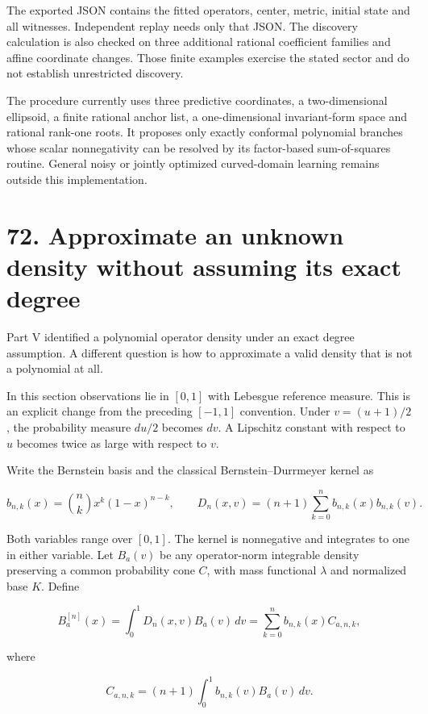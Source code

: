 \documentclass[11pt,letterpaper]{article}
\begin{document}
The exported JSON contains the fitted operators, center, metric, initial
state and all witnesses. Independent replay needs only that JSON. The
discovery calculation is also checked on three additional rational
coefficient families and affine coordinate changes. Those finite
examples exercise the stated sector and do not establish unrestricted
discovery.

The procedure currently uses three predictive coordinates, a
two-dimensional ellipsoid, a finite rational anchor list, a
one-dimensional invariant-form space and rational rank-one roots. It
proposes only exactly conformal polynomial branches whose scalar
nonnegativity can be resolved by its factor-based sum-of-squares
routine. General noisy or jointly optimized curved-domain learning
remains outside this implementation.

\section{72. Approximate an unknown density without assuming its exact
degree}\label{approximate-an-unknown-density-without-assuming-its-exact-degree}

Part V identified a polynomial operator density under an exact degree
assumption. A different question is how to approximate a valid density
that is not a polynomial at all.

In this section observations lie in \([0,1]\) with Lebesgue reference
measure. This is an explicit change from the preceding \([-1,1]\)
convention. Under \(v=(u+1)/2\), the probability measure \(du/2\)
becomes \(dv\). A Lipschitz constant with respect to \(u\) becomes twice
as large with respect to \(v\).

Write the Bernstein basis and the classical Bernstein--Durrmeyer kernel
as

\[
b_{n,k}(x)=\binom nk x^k(1-x)^{n-k},\qquad
D_n(x,v)=(n+1)\sum_{k=0}^n b_{n,k}(x)b_{n,k}(v).
\]

Both variables range over \([0,1]\). The kernel is nonnegative and
integrates to one in either variable. Let \(B_a(v)\) be any
operator-norm integrable density preserving a common probability cone
\(C\), with mass functional \(\lambda\) and normalized base \(K\).
Define

\[
B_a^{[n]}(x)=\int_0^1D_n(x,v)B_a(v)\,dv
=\sum_{k=0}^n b_{n,k}(x)C_{a,n,k},
\]

where

\[
C_{a,n,k}=(n+1)\int_0^1b_{n,k}(v)B_a(v)\,dv.
\]
\end{document}
